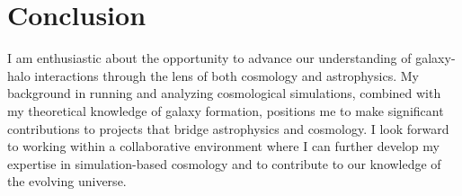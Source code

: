 \documentclass[12pt]{article}
\begin{document}
\section*{Conclusion}
I am enthusiastic about the opportunity to advance our understanding of galaxy-halo interactions through the lens of both cosmology and astrophysics. My background in running and analyzing cosmological simulations, combined with my theoretical knowledge of galaxy formation, positions me to make significant contributions to projects that bridge astrophysics and cosmology. I look forward to working within a collaborative environment where I can further develop my expertise in simulation-based cosmology and to contribute to our knowledge of the evolving universe.
\end{document}
